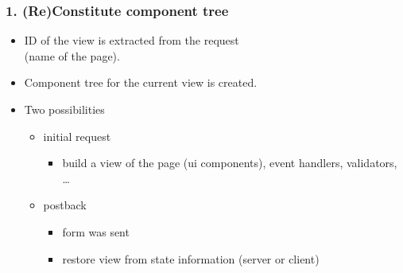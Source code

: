 \documentclass[10pt,xcolor=pdflatex]{beamer}
\begin{document}
\begin{frame}\frametitle{1. (Re)Constitute component tree}
	\begin{itemize}
		\item ID of the view is extracted from the request \\(name of the page).
		\item Component tree for the current view is created.
		\item Two possibilities
          \begin{itemize}
        	\item initial request
              \begin{itemize}
            	\item build a view of the page (ui components), event handlers, validators, \ldots
              \end{itemize}
            \item postback
              \begin{itemize}
                \item form was sent
            	\item restore view from state information (server or client)
              \end{itemize}
          \end{itemize}
	\end{itemize}
\end{frame}
\end{document}

